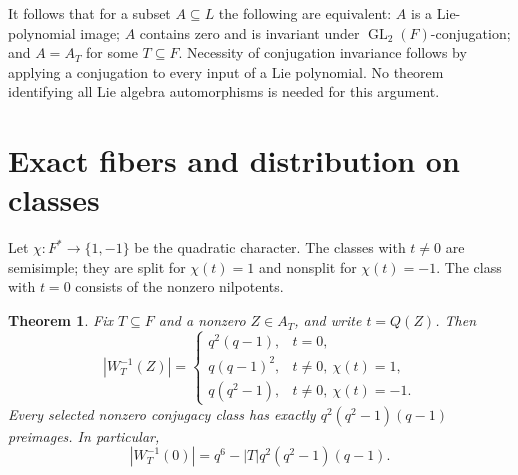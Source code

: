 \documentclass[11pt]{article}
\newtheorem{theorem}{Theorem}
\newcommand{\GL}{\operatorname{GL}}
\begin{document}
It follows that for a subset $A\subseteq L$ the following are equivalent:
$A$ is a Lie-polynomial image; $A$ contains zero and is invariant under
$\GL_2(F)$-conjugation; and $A=A_T$ for some $T\subseteq F$.
Necessity of conjugation invariance follows by applying a conjugation to
every input of a Lie polynomial. No theorem identifying all Lie algebra
automorphisms is needed for this argument.

\section{Exact fibers and distribution on classes}
Let $\chi:F^*\to\{1,-1\}$ be the quadratic character. The classes with
$t\neq0$ are semisimple; they are split for $\chi(t)=1$ and nonsplit for
$\chi(t)=-1$. The class with $t=0$ consists of the nonzero nilpotents.

\begin{theorem}\label{thm:fibers}
Fix $T\subseteq F$ and a nonzero $Z\in A_T$, and write $t=Q(Z)$. Then
\begin{equation}\label{eq:fibers}
 |W_T^{-1}(Z)|=
 \begin{cases}
 q^2(q-1),&t=0,\\
 q(q-1)^2,&t\neq0,\ \chi(t)=1,\\
 q(q^2-1),&t\neq0,\ \chi(t)=-1.
 \end{cases}
\end{equation}
Every selected nonzero conjugacy class has exactly
$q^2(q^2-1)(q-1)$ preimages. In particular,
\begin{equation}\label{eq:zero}
 |W_T^{-1}(0)|=q^6-|T|q^2(q^2-1)(q-1).
\end{equation}
\end{theorem}
\end{document}
